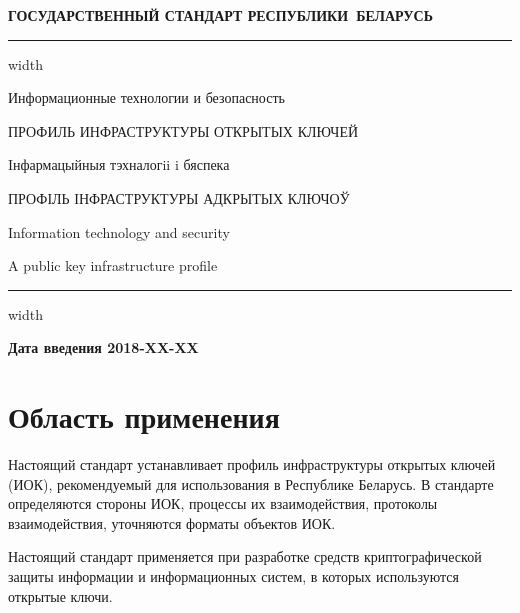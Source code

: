 \begin{center}
{\bfseries
ГОСУДАРСТВЕННЫЙ СТАНДАРТ РЕСПУБЛИКИ~БЕЛАРУСЬ
\vskip 2pt
\hrule width\textwidth

\vskip 9pt

Информационные технологии и безопасность

ПРОФИЛЬ ИНФРАСТРУКТУРЫ ОТКРЫТЫХ КЛЮЧЕЙ

\vskip 9pt

Iнфармацыйныя тэхналогii i бяспека

ПРОФІЛЬ ІНФРАСТРУКТУРЫ АДКРЫТЫХ КЛЮЧОЎ
} %

\vskip 9pt

Information technology and security

A public key infrastructure profile

\vskip 4pt                
\hrule width \textwidth
\end{center}

\mbox{}\hfill{\bfseries Дата введения 2018-XX-XX}

\chapter{Область применения}

Настоящий стандарт устанавливает профиль инфраструктуры открытых ключей (ИОК),
рекомендуемый для использования в Республике Беларусь.
%
В стандарте определяются стороны ИОК, процессы их взаимодействия,
протоколы взаимодействия, 
уточняются форматы объектов ИОК.

Настоящий стандарт применяется при разработке средств 
криптографической защиты информации и информационных систем, в которых 
используются открытые ключи.  



